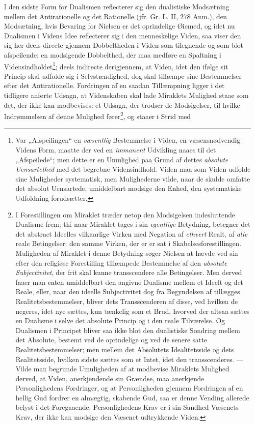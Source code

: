 \documentclass[12pt,a4paper]{book}
\newcommand{\opage}[1]{\marginnote{\footnotesize\textit{[#1]}}}
\begin{document}
I den sidste Form for Dualismen reflecterer sig den dualistiske Modsætning mellem det
Antirationelle og det Rationelle (jfr. Gr. L. II, 278 Anm.), den Modsætning, hvis Bevaring
for Nielsen er det oprindelige Øiemed, og idet nu Dualismen i Videns Idee reflecterer sig i
den menneskelige Viden, saa viser den sig her deels directe gjennem Dobbeltheden i Viden som
tilegnende og som blot afspeilende: en modsigende Dobbelthed, der maa medføre en Spaltning i
Vidensindholdet\footnote{Var „Afspeilingen“ en \emph{væsentlig} Bestemmelse i Viden, en
væsensnødvendig Videns Form, maatte der ved en \emph{immanent} Udvikling naaes til det
„Afspeilede“; men dette er en Umulighed paa Grund af dettes \emph{absolute Uensartethed} med det
begrebne Vidensindhold. Viden maa som Viden udfolde sine Muligheder systematisk, men
Mulighederne vilde, naar de skulde omfatte det absolut Uensartede, umiddelbart modsige den
Enhed, den systematiske Udfoldning forudsætter.}; deels indirecte derigjennem, at Viden, idet
den ifølge sit Princip skal udfolde sig i Selvstændighed, dog skal tillæmpe sine Bestemmelser
efter det Antirationelle. Fordringen af en saadan Tillæmpning ligger i det tidligere anførte
Udsagn, at Videnskaben skal lade Miraklets Mulighed staae som det, der ikke kan modbevises:
et Udsagn, der trodser de Modsigelser, til hvilke Indrømmelsen af denne Mulighed
\opage{175}fører\footnote{I Forestillingen om Miraklet træder netop den Modsigelsen indesluttende
Dualisme frem; thi naar Miraklet tages i sin \emph{egentlige} Betydning, betegner det det abstract
Ideelles vilkaarlige Virken med Negation af \emph{ethvert} Realt, af \emph{alle} reale Betingelser: den samme Virken, der er er sat i Skabelsesforestillingen. Muligheden af Miraklet i denne Betydning
søger Nielsen at hævde ved sin efter den religiøse Forestilling tillæmpede Bestemmelse af den \emph{absolute Subjectivitet}, der frit skal kunne transscendere alle Betingelser. Men derved faaer
man enten umiddelbart den angivne Dualisme mellem et Ideelt og det Reale, eller, naar den
ideelle Subjectivitet dog fra Begyndelsen af tillægges Realitetsbestemmelser, bliver dets
Transscenderen af disse, ved hvilken de negeres, idet nye sættes, kun tænkelig som et Brud,
hvorved der altsaa sættes en Dualisme i selve det absolute Princip og i den reale
Tilværelse. Og Dualismen i Principet bliver saa ikke blot den dualistiske Sondring mellem det
Absolute, bestemt ved de oprindelige og ved de senere satte Realitetsbestemmelser; men mellem
det Absolutets Idealitetsside og dets Realitetsside, hvilken sidste sættes som et Intet, idet
den transscenderes. --- Vilde man begrunde Umuligheden af at modbevise Miraklets Mulighed
derved, at Viden, anerkjendende sin Grændse, maa anerkjende Personlighedens Fordringer, og at
Personligheden gjennem Fordringen af en hellig Gud fordrer en almægtig, skabende Gud, saa er
denne Vending allerede belyst i det Foregaaende. Personlighedens Krav er i sin Sandhed
Væsenets Krav, der ikke kan modsige den Væsenet udtrykkende Viden.}, og staaer i Strid med
\end{document}
